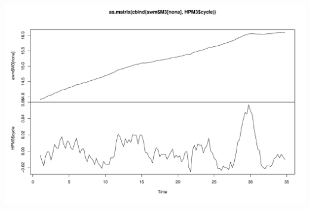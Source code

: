 \documentclass[11pt,oneside, a4paper]{amsart}\usepackage[]{graphicx}\usepackage[]{color}
\newenvironment{knitrout}{}{} %
\begin{document}
\begin{knitrout}
\color{fgcolor}

{\centering \includegraphics[width=\textwidth]{figure/hp_filter-1} 

}



\end{knitrout}







\clearpage
\newpage



\end{document}

